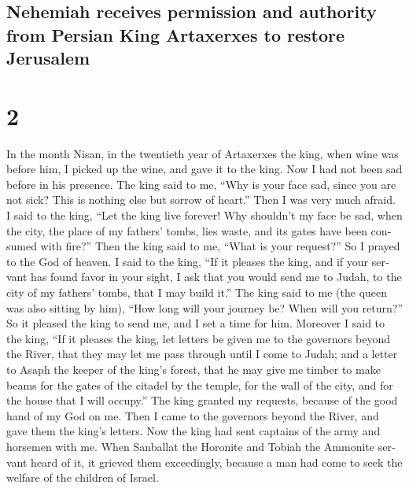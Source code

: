 \begin{paracol}{2}
\switchcolumn
\begin{otherlanguage}{english}

\hypertarget{nehemiah-receives-permission-and-authority-from-persian-king-artaxerxes-to-restore-jerusalem}{%
\subsection{Nehemiah receives permission and authority from Persian King
Artaxerxes to restore
Jerusalem}\label{nehemiah-receives-permission-and-authority-from-persian-king-artaxerxes-to-restore-jerusalem}}

\hypertarget{section-3}{%
\section{2}\label{section-3}}

 In the month Nisan, in the twentieth year of Artaxerxes
the king, when wine was before him, I picked up the wine, and gave it to
the king. Now I had not been sad before in his presence. 
The king said to me, ``Why is your face sad, since you are not sick?
This is nothing else but sorrow of heart.'' Then I was very much afraid.
 I said to the king, ``Let the king live forever! Why
shouldn't my face be sad, when the city, the place of my fathers' tombs,
lies waste, and its gates have been consumed with fire?'' 
Then the king said to me, ``What is your request?'' So I prayed to the
God of heaven.  I said to the king, ``If it pleases the
king, and if your servant has found favor in your sight, I ask that you
would send me to Judah, to the city of my fathers' tombs, that I may
build it.''  The king said to me (the queen was also
sitting by him), ``How long will your journey be? When will you
return?'' So it pleased the king to send me, and I set a time for him.
 Moreover I said to the king, ``If it pleases the king,
let letters be given me to the governors beyond the River, that they may
let me pass through until I come to Judah;  and a letter
to Asaph the keeper of the king's forest, that he may give me timber to
make beams for the gates of the citadel by the temple, for the wall of
the city, and for the house that I will occupy.'' The king granted my
requests, because of the good hand of my God on me.  Then
I came to the governors beyond the River, and gave them the king's
letters. Now the king had sent captains of the army and horsemen with
me.  When Sanballat the Horonite and Tobiah the Ammonite
servant heard of it, it grieved them exceedingly, because a man had come
to seek the welfare of the children of Israel.


\end{otherlanguage}
\end{paracol}
